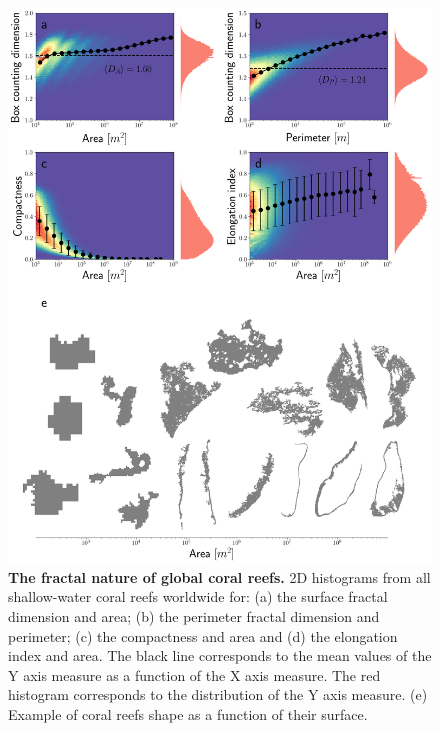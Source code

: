 \begin{figure}[H]
    \centering

    \includegraphics[width=1\textwidth]{Figures/individual_reef_analysis_complete.pdf}
    \caption[The fractal nature of global coral reefs]{\textbf{The fractal
            nature of global coral reefs.} 2D
        histograms from all shallow-water coral reefs worldwide for: (a) the
        surface
        fractal dimension and area; (b) the perimeter fractal dimension and
        perimeter;
        (c) the compactness and area and (d) the elongation index and area. The
        black
        line corresponds to the mean values of the Y axis measure as a function
        of the X
        axis measure. The red histogram corresponds to the distribution of the
        Y axis
        measure. (e) Example of coral reefs shape as a function of their
        surface.}
    \label{fig:individual_reef_analysis}
\end{figure}

